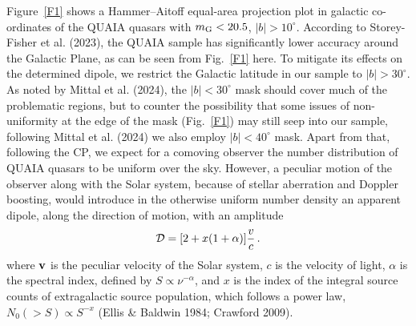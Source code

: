 \documentclass[fleqn,usenatbib]{mnras}
\begin{document}
Figure~\ref{F1} shows a Hammer--Aitoff equal-area projection plot in galactic co-ordinates of the QUAIA quasars with $m_{\rm G}< 20.5$, $|b|>10^\circ$. 
According to Storey-Fisher et al. (2023), the QUAIA sample has significantly lower accuracy around the Galactic Plane, as can be seen from Fig.~\ref{F1} here. To mitigate its effects on the determined dipole, we restrict the Galactic latitude in our sample to $|b|>30^\circ$. As noted by Mittal et al. (2024), the $|b|<30^\circ$ mask should cover much of the problematic regions, but to counter the possibility that some issues of non-uniformity at the edge of the mask (Fig.~\ref{F1}) may still seep into our sample, following Mittal et al. (2024) we also employ $|b|<40^\circ$ mask. Apart from that, following the CP, we expect for a comoving observer the number distribution of QUAIA quasars to be uniform over the sky.
However, a peculiar motion of the observer along with the Solar system, because of stellar aberration and Doppler boosting, would introduce in the otherwise uniform number density an apparent dipole, along the direction of motion, with an amplitude  
\begin{equation}
\label{eq:7}
{\cal D}=[2+ x (1+\alpha)]\frac {v}{c}\,.
\end{equation}
where $\bf v$ is the peculiar velocity of the  Solar system, $c$ is the velocity of light, $\alpha$ is the spectral index, defined by $S \propto \nu^{-\alpha}$, and $x$ is the index of the integral source counts of extragalactic source population, which follows a power law, $N_0(>S)\propto S^{-x}$ (Ellis \& Baldwin 1984; Crawford 2009). 

\end{document}
